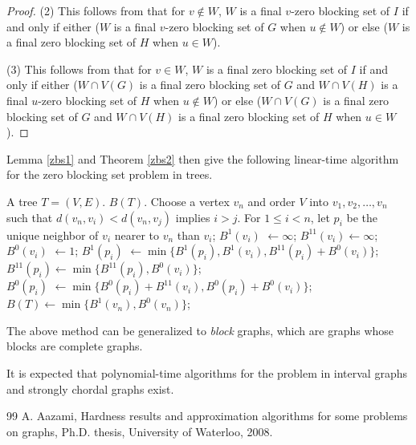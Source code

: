 \documentclass[preprint,12pt]{elsarticle}
\begin{document}
{\begin{proof}
(2) This follows from that for $v\notin W$, $W$ is a {final} $v$-zero blocking set of $I$
if and only if either ($W$ is a {final} $v$-zero blocking set of $G$ when $u\notin W$)
or else ($W$ is a {final} zero blocking set of $H$ when $u\in W$).

(3) This follows from that for $v\in W$, $W$ is a {final} zero blocking set of $I$
if and only if either ($W\cap V(G)$ is a {final} zero blocking set of $G$ and $W\cap V(H)$ is a {final} $u$-zero blocking set of $H$ when $u\notin W$)
or else ($W\cap V(G)$ is a {final} zero blocking set of $G$ and $W\cap V(H)$ is a {final} zero blocking set of $H$ when $u\in W$).
\end{proof}

Lemma \ref{zbs1} and Theorem \ref{zbs2} then give the following linear-time algorithm
for the zero blocking set problem in trees.


\begin{algorithm}[htp!]
\caption{\bf zbsTreeD.}\label{algo1}
\begin{algorithmic}[xxx]
  \Require A tree $T=(V,E)$.
  \Ensure $B(T)$.
\State
Choose a vertex $v_n$ and order $V$ into $v_1,v_2,\ldots, v_n$
such that $d(v_n,v_i)<d(v_n,v_j)$ implies $i>j$.
For $1\le i<n$, let $p_i$ be the unique neighbor of $v_i$ nearer to $v_n$ than $v_i$;
\State $B^1(v_i)\,\, \leftarrow \infty$;
\State $B^{11}(v_i) \leftarrow \infty$;
\State $B^0(v_i)\,\, \leftarrow 1$;
\EndFor
{}
\State  $B^1(p_i)\,\, \leftarrow \min\{B^1(p_i),B^1(v_i),B^{11}(p_i)+B^0(v_i)\}$;
\State  $B^{11}(p_i) \leftarrow \min\{B^{11}(p_i),B^0(v_i)\}$;
\State  $B^{0}(p_i)\,\, \leftarrow \min\{B^0(p_i) + B^{11}(v_i),B^0(p_i) + B^0(v_i)\}$;
\EndFor
\State $B(T) \leftarrow \min\{B^1(v_n), B^0(v_n)\}$;
\end{algorithmic}
\end{algorithm}


The above method can be generalized to {\em block} graphs, which are graphs whose blocks are complete graphs.

It is expected that polynomial-time algorithms for the problem in interval graphs and strongly chordal graphs exist.


\frenchspacing
\begin{thebibliography}{99}
A. Aazami,
Hardness results and approximation algorithms for some problems on graphs,
Ph.D. thesis, University of Waterloo, 2008.


\end{thebibliography}}
\end{document}
